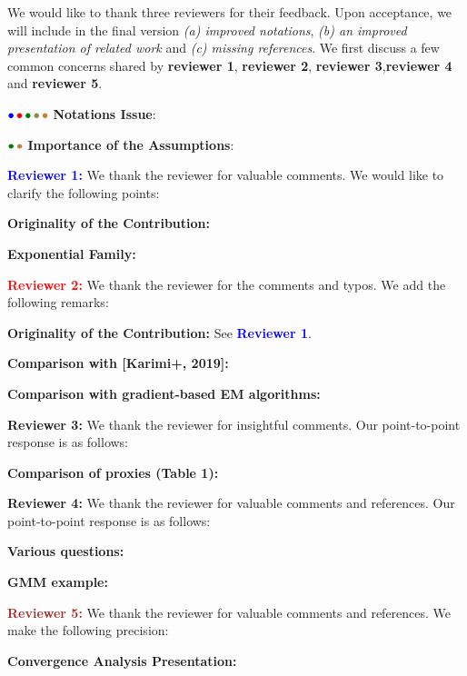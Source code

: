 \documentclass{article}
\begin{document}
We would like to thank three reviewers for their feedback. Upon acceptance, we will include in the final version \emph{{\sf (a)} improved notations}, \emph{{\sf (b)} an improved presentation of related work} and \emph{{\sf (c)} missing references}. 
We first discuss a few common concerns shared by \textbf{\color{blue}reviewer 1}, \textbf{\color{red} reviewer 2}, \textbf{\color{green!50!black}reviewer 3},\textbf{\color{yellow!50!black}reviewer 4} and \textbf{\color{brown}reviewer 5}.

${\color{blue}\bullet}\!~{\color{red}\bullet}\!~{\color{green!50!black}\bullet}\!~{\color{yellow!50!black}\bullet}\!~{\color{brown}\bullet}$ \textbf{Notations Issue}: 


${\color{green!50!black}\bullet}\!~{\color{brown}\bullet}$ \textbf{Importance of the Assumptions}: 



\textbf{\textcolor{blue}{Reviewer 1:}} We thank the reviewer for valuable comments. We would like to clarify the following points:

\textbf{Originality of the Contribution:}

\textbf{Exponential Family:}


\textbf{\textcolor{red}{Reviewer 2:}} We thank the reviewer for the comments and typos. We add the following remarks:

\textbf{Originality of the Contribution:} See \textbf{\textcolor{blue}{Reviewer 1}}.

\textbf{Comparison with [Karimi+, 2019]:}

\textbf{Comparison with gradient-based EM algorithms:}


\textbf{\textcolor{green!50!black}{Reviewer 3:}} We thank the reviewer for insightful comments. Our point-to-point response is as follows:


\textbf{Comparison of proxies (Table 1):}

\textbf{\textcolor{yellow!50!black}{Reviewer 4:}} We thank the reviewer for valuable comments and references. Our point-to-point response is as follows:

\textbf{Various questions:}

\textbf{GMM example:}


\textbf{\textcolor{brown}{Reviewer 5:}} We thank the reviewer for valuable comments and references. We make the following precision:

\textbf{Convergence Analysis Presentation:}
\end{document}
